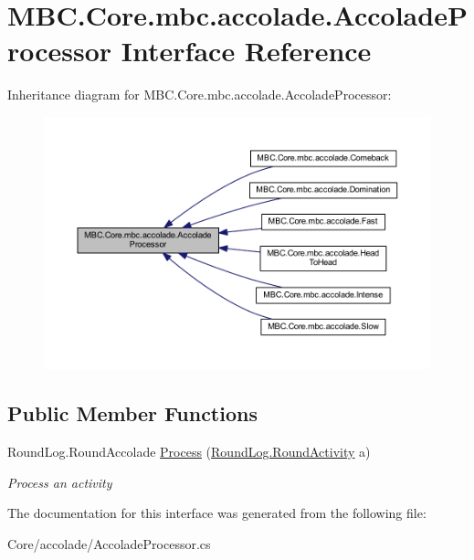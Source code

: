 \hypertarget{interface_m_b_c_1_1_core_1_1mbc_1_1accolade_1_1_accolade_processor}{\section{M\-B\-C.\-Core.\-mbc.\-accolade.\-Accolade\-Processor Interface Reference}
\label{interface_m_b_c_1_1_core_1_1mbc_1_1accolade_1_1_accolade_processor}
}


Inheritance diagram for M\-B\-C.\-Core.\-mbc.\-accolade.\-Accolade\-Processor\-:\nopagebreak
\begin{figure}[H]
\begin{center}
\leavevmode
\includegraphics[width=350pt]{interface_m_b_c_1_1_core_1_1mbc_1_1accolade_1_1_accolade_processor__inherit__graph}
\end{center}
\end{figure}
\subsection*{Public Member Functions}
\begin{DoxyCompactItemize}
\item 
\hypertarget{interface_m_b_c_1_1_core_1_1mbc_1_1accolade_1_1_accolade_processor_a05f404f33d6ea3c54b6910094b992bac}{Round\-Log.\-Round\-Accolade \hyperlink{interface_m_b_c_1_1_core_1_1mbc_1_1accolade_1_1_accolade_processor_a05f404f33d6ea3c54b6910094b992bac}{Process} (\hyperlink{class_m_b_c_1_1_core_1_1_round_log_1_1_round_activity}{Round\-Log.\-Round\-Activity} a)}\label{interface_m_b_c_1_1_core_1_1mbc_1_1accolade_1_1_accolade_processor_a05f404f33d6ea3c54b6910094b992bac}

\begin{DoxyCompactList}\small\item\em Process an activity\end{DoxyCompactList}\end{DoxyCompactItemize}


The documentation for this interface was generated from the following file\-:\begin{DoxyCompactItemize}
\item 
Core/accolade/Accolade\-Processor.\-cs\end{DoxyCompactItemize}
